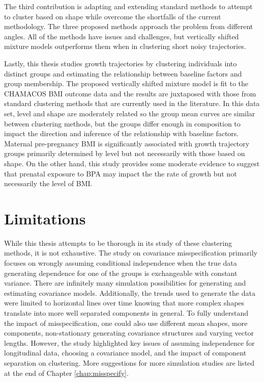 The third contribution is adapting and extending standard methods to attempt to cluster based on shape while overcome the shortfalls of the current methodology. The three proposed methods approach the problem from different angles. All of the methods have issues and challenges, but vertically shifted mixture models outperforms them when in clustering short noisy trajectories.

Lastly, this thesis studies growth trajectories by clustering individuals into distinct groups and estimating the relationship between baseline factors and group membership. The proposed vertically shifted mixture model is fit to the CHAMACOS BMI outcome data and the results are juxtaposed with those from standard clustering methods that are currently used in the literature. In this data set, level and shape are moderately related so the group mean curves are similar between clustering methods, but the groups differ enough in composition to impact the direction and inference of the relationship with baseline factors. Maternal pre-pregnancy BMI is significantly associated with growth trajectory groups primarily determined by level but not necessarily with those based on shape. On the other hand, this study provides some moderate evidence to suggest that prenatal exposure to BPA may impact the the rate of growth but not necessarily the level of BMI.

\section{Limitations}
While this thesis attempts to be thorough in its study of these clustering methods, it is not exhaustive. The study on covariance misspecification primarily focuses on wrongly assuming conditional independence when the true data generating dependence for one of the groups is exchangeable with constant variance. There are infinitely many simulation possibilities for generating and estimating covariance models. Additionally, the trends used to generate the data were limited to horizontal lines over time knowing that more complex shapes translate into more well separated components in general. To fully understand the impact of misspecification, one could also use different mean shapes, more components, non-stationary generating covariance structures and varying vector lengths. However, the study highlighted key issues of assuming independence for longitudinal data, choosing a covariance model, and the impact of component separation on clustering. More suggestions for more simulation studies are listed at the end of Chapter \ref{chap:misspecify}. 

